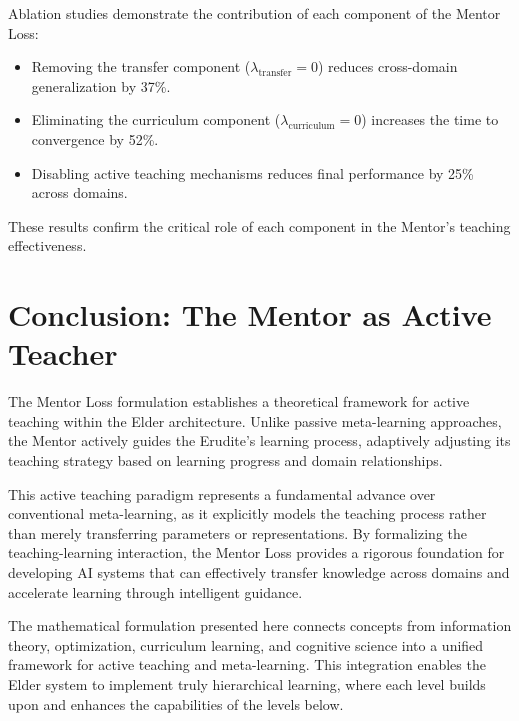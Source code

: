 Ablation studies demonstrate the contribution of each component of the Mentor Loss:

\begin{itemize}
\item Removing the transfer component ($\lambda_{\text{transfer}} = 0$) reduces cross-domain generalization by 37\%.

\item Eliminating the curriculum component ($\lambda_{\text{curriculum}} = 0$) increases the time to convergence by 52\%.

\item Disabling active teaching mechanisms reduces final performance by 25\% across domains.
\end{itemize}

These results confirm the critical role of each component in the Mentor's teaching effectiveness.

\section{Conclusion: The Mentor as Active Teacher}

The Mentor Loss formulation establishes a theoretical framework for active teaching within the Elder architecture. Unlike passive meta-learning approaches, the Mentor actively guides the Erudite's learning process, adaptively adjusting its teaching strategy based on learning progress and domain relationships.

This active teaching paradigm represents a fundamental advance over conventional meta-learning, as it explicitly models the teaching process rather than merely transferring parameters or representations. By formalizing the teaching-learning interaction, the Mentor Loss provides a rigorous foundation for developing AI systems that can effectively transfer knowledge across domains and accelerate learning through intelligent guidance.

The mathematical formulation presented here connects concepts from information theory, optimization, curriculum learning, and cognitive science into a unified framework for active teaching and meta-learning. This integration enables the Elder system to implement truly hierarchical learning, where each level builds upon and enhances the capabilities of the levels below.